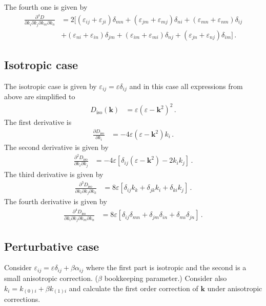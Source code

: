 \documentclass[12pt,a4paper,twoside,openright,BCOR10mm,headsepline,titlepage,abstracton,chapterprefix,final]{scrreprt}
\newcommand{\vct}[1]{\mathbf{#1}}
\newcommand{\eps}[1]{\varepsilon_{#1}}
\newcommand{\an}[1]{\alpha_{#1}}
\begin{document}
The fourth one is given by
\begin{align}
 \frac{\partial^4 D}{\partial k_i \partial k_j \partial k_m \partial k_n} &= 2 \biggl[
  (\eps{ij} + \eps{ji}) \delta_{mn}
  +(\eps{jm} + \eps{mj}) \delta_{ni}
  +(\eps{mn} + \eps{nm}) \delta_{ij} \nonumber\\&
  +(\eps{ni} + \eps{in}) \delta_{jm}
  +(\eps{im} + \eps{mi}) \delta_{nj}
  +(\eps{jn} + \eps{nj}) \delta_{im}  
 \biggr]\,.
\end{align}




\subsection{Isotropic case}
The isotropic case is given by $\eps{ij} = \varepsilon \delta_{ij}$ and in this case all expressions from above are simplified to
\begin{align}
 D_\text{iso}(\vct{k}) &= \varepsilon (\varepsilon - \vct{k}^2)^2\,.
\end{align}
The first derivative is
\begin{align}
 \frac{\partial D_\text{iso}}{\partial k_i} &= -4 \varepsilon (\varepsilon - \vct{k}^2) k_i\,.
\end{align}
The second derivative is given by
\begin{align}
 \frac{\partial^2 D_\text{iso}}{\partial k_i \partial k_j} &= -4 \varepsilon [ \delta_{ij} (\varepsilon - \vct{k}^2) - 2 k_i k_j ]\,.
\end{align}
The third derivative is given by
\begin{align}
 \frac{\partial^3 D_\text{iso}}{\partial k_i \partial k_j \partial k_k} &= 8 \varepsilon [ \delta_{ij} k_k + \delta_{jk} k_i + \delta_{ki} k_j ]\,.
\end{align}
The fourth derivative is given by
\begin{align}
 \frac{\partial^4 D_\text{iso}}{\partial k_i \partial k_j \partial k_m \partial k_n} &= 8 \varepsilon [ \delta_{ij} \delta_{mn} + \delta_{jm} \delta_{in} + \delta_{mi} \delta_{jn} ]\,.
\end{align}





\subsection{Perturbative case}

Consider $\eps{ij} = \varepsilon \delta_{ij} + \beta \an{ij}$ where the first part is isotropic and the second is a small anisotropic correction.
($\beta$ bookkeeping parameter.)
Consider also $k_i = k_{(0)i} + \beta k_{(1)i}$ and calculate the first order correction of $\vct{k}$ under anisotropic corrections.
\end{document}
